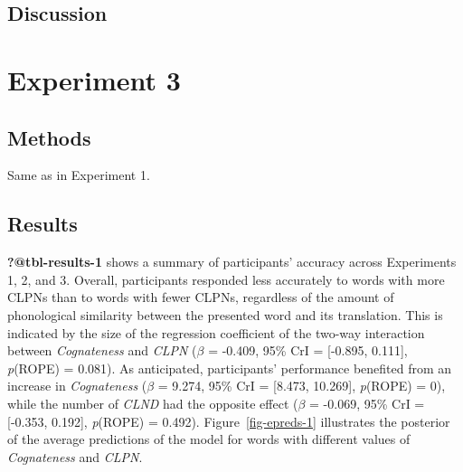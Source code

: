 \documentclass[
]{article}
\begin{document}
\subsection{Discussion}\label{discussion-1}

\section{Experiment 3}\label{experiment-3}

\subsection{Methods}\label{methods-2}

Same as in Experiment 1.

\subsection{Results}\label{results-2}

\textbf{?@tbl-results-1} shows a summary of participants' accuracy
across Experiments 1, 2, and 3. Overall, participants responded less
accurately to words with more CLPNs than to words with fewer CLPNs,
regardless of the amount of phonological similarity between the
presented word and its translation. This is indicated by the size of the
regression coefficient of the two-way interaction between
\emph{Cognateness} and \emph{CLPN} (\(\beta\) = -0.409, 95\% CrI =
{[}-0.895, 0.111{]}, \emph{p}(ROPE) = 0.081). As anticipated,
participants' performance benefited from an increase in
\emph{Cognateness} (\(\beta\) = 9.274, 95\% CrI = {[}8.473, 10.269{]},
\emph{p}(ROPE) = 0), while the number of \emph{CLND} had the opposite
effect (\(\beta\) = -0.069, 95\% CrI = {[}-0.353, 0.192{]},
\emph{p}(ROPE) = 0.492). Figure~\ref{fig-epreds-1} illustrates the
posterior of the average predictions of the model for words with
different values of \emph{Cognateness} and \emph{CLPN}.

\begin{figure}


\caption{\label{fig-epreds-3}}

\end{figure}%
\end{document}
